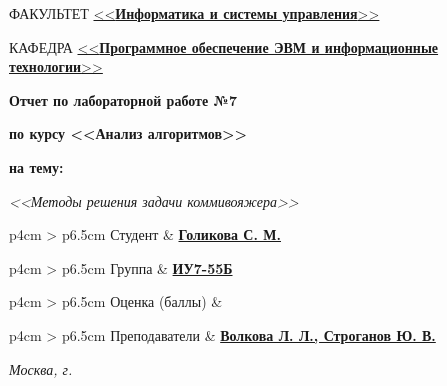 \begin{titlepage}
	\begin{flushleft}
		\fontsize{12pt}{0.8\baselineskip}\selectfont 
		
		ФАКУЛЬТЕТ \uline{<<\textbf{Информатика и системы управления}>> \hfill}
		
		КАФЕДРА \uline{\mbox{\hspace{4mm}} <<\textbf{Программное обеспечение ЭВМ и информационные технологии}>> \hfill}
	\end{flushleft}

	\vfill

	\begin{center}
		\fontsize{20pt}{\baselineskip}\selectfont

		\textbf{Отчет по лабораторной работе №7}

		\textbf{по курсу <<Анализ алгоритмов>>}

		\textbf{на тему:}
	\end{center}

	\begin{center}
		\fontsize{18pt}{0.6cm}\selectfont 
		
			\textit{<<Методы решения задачи коммивояжера>>}
		
	\end{center}

	\vfill

	\begin{table}[h!]
		\fontsize{12pt}{0.7\baselineskip}\selectfont
		
		\begin{signstabular}[0.55]{p{4cm} > {\centering\arraybackslash}p{6.5cm}}
				Студент & \uline{\textbf{Голикова С. М.} \hfill} 
		\end{signstabular}
		
		\begin{signstabular}[0.55]{p{4cm} > {\centering\arraybackslash}p{6.5cm}}
				Группа & \uline{\textbf{ИУ7-55Б} \hfill} 
		\end{signstabular}
		
		\begin{signstabular}[0.55]{p{4cm} > {\centering\arraybackslash}p{6.5cm}}
				Оценка (баллы) & \uline{\mbox{\hspace*{6.5cm}}} 
		\end{signstabular}
		
		\begin{signstabular}[0.55]{p{4cm} > {\centering\arraybackslash}p{6.5cm}}
				Преподаватели & \uline{\textbf{Волкова Л. Л., Строганов Ю. В.} \hfill}
		\end{signstabular}
	\end{table}
	
	\vfill

	\begin{center}
		\normalsize \textit{Москва, \the\year г.}
	\end{center}
\end{titlepage}
